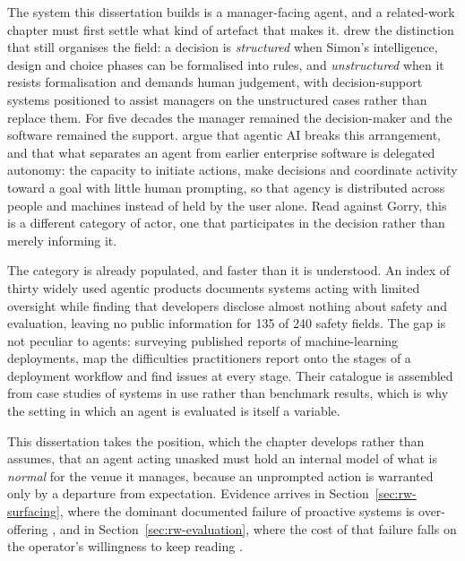 The system this dissertation builds is a manager-facing agent, and a related-work
chapter must first settle what kind of artefact that makes it.
\citet{gorry_framework_1971} drew the distinction that still organises the field:
a decision is \emph{structured} when Simon's intelligence, design and choice
phases can be formalised into rules, and \emph{unstructured} when it resists
formalisation and demands human judgement, with decision-support systems
positioned to assist managers on the unstructured cases rather than replace them.
For five decades the manager remained the decision-maker and the software
remained the support. \citet{kumar_agentic_2026} argue that agentic AI breaks
this arrangement, and that what separates an agent from earlier enterprise
software is delegated autonomy: the capacity to initiate actions, make decisions
and coordinate activity toward a goal with little human prompting, so that agency
is distributed across people and machines instead of held by the user alone. Read
against Gorry, this is a different category of actor, one that participates in
the decision rather than merely informing it.

The category is already populated, and faster than it is understood. An index of
thirty widely used agentic products
\citep[a 2026 preprint]{staufer_2025_2026} documents systems acting with limited
oversight while finding that developers disclose almost nothing about safety and
evaluation, leaving no public information for 135 of 240 safety fields. The gap
is not peculiar to agents: surveying published reports of machine-learning
deployments, \citet{paleyes_challenges_2022} map the difficulties practitioners
report onto the stages of a deployment workflow and find issues at every stage.
Their catalogue is assembled from case studies of systems in use rather than
benchmark results, which is why the setting in which an agent is evaluated is
itself a variable.

This dissertation takes the position, which the chapter develops rather than
assumes, that an agent acting unasked must hold an internal model of what is
\emph{normal} for the venue it manages, because an unprompted action is warranted
only by a departure from expectation. Evidence arrives in
Section~\ref{sec:rw-surfacing}, where the dominant documented failure of
proactive systems is over-offering \citep{lu_proactive_2024}, and in
Section~\ref{sec:rw-evaluation}, where the cost of that failure falls on the
operator's willingness to keep reading
\citep{dixon_independence_2007,ancker_effects_2017}.

